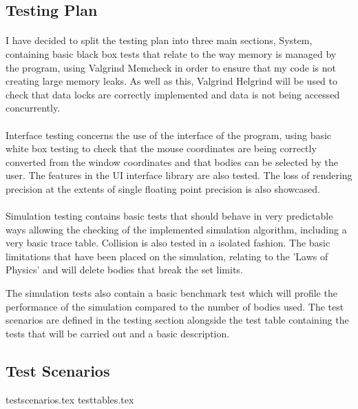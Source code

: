 \pagebreak
\subsection{Testing Plan}
\paragraph{}
I have decided to split the testing plan into three main sections, System, containing basic black box tests that relate to the way memory is managed by the program, using Valgrind Memcheck in order to ensure that my code is not creating large memory leaks. As well as this, Valgrind Helgrind will be used to check that data locks are correctly implemented and data is not being accessed concurrently.

\paragraph{}
Interface testing concerns the use of the interface of the program, using basic white box testing to check that the mouse coordinates are being correctly converted from the window coordinates and that bodies can be selected by the user. The features in the UI interface library are also tested. The loss of rendering precision at the extents of single floating point precision is also showcased.

\paragraph{}
Simulation testing contains basic tests that should behave in very predictable ways allowing the checking of the implemented simulation algorithm, including a very basic trace table. Collision is also tested in a isolated fashion. The basic limitations that have been placed on the simulation, relating to the 'Laws of Physics' and will delete bodies that break the set limits.

The simulation tests also contain a basic benchmark test which will profile the performance of the simulation compared to the number of bodies used. The test scenarios are defined in the testing section alongside the test table containing the tests that will be carried out and a basic description.
\pagebreak

\subsection{Test Scenarios}
{testscenarios.tex}
{testtables.tex}
\pagebreak
